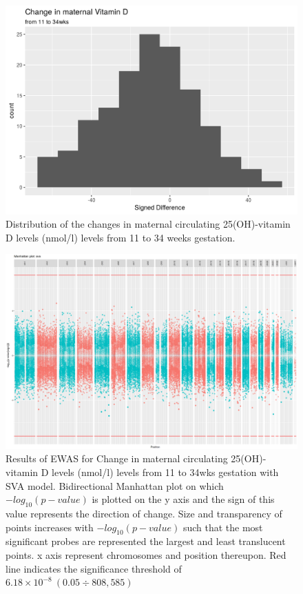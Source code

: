 \documentclass[
]{book}
\begin{document}
\begin{figure}

{\centering \includegraphics[width=0.8\linewidth]{figs/MAVIDOSdifVD} 

}

\caption{Distribution of the changes in maternal circulating 25(OH)-vitamin D levels (nmol/l) levels from 11 to 34 weeks gestation.}\label{fig:MAVIDOSdifVD}
\end{figure}



\begin{figure}

{\centering \includegraphics[width=0.8\linewidth]{figs/MAVIDOSdifVDEPICewasManhattanSVA} 

}

\caption{Results of EWAS for Change in maternal circulating 25(OH)-vitamin D levels (nmol/l) levels from 11 to 34wks gestation with SVA model. Bidirectional Manhattan plot on which \(-log_{10}(p-value)\) is plotted on the y axis and the sign of this value represents the direction of change. Size and transparency of points increases with \(-log_{10}(p-value)\) such that the most significant probes are represented the largest and least translucent points. x axis represent chromosomes and position thereupon. Red line indicates the significance threshold of \(6.18\times10^{-8}~(0.05\div808,585)\)}\label{fig:MAVIDOSdifVDEPICewasManhattanSVA}
\end{figure}
\end{document}
